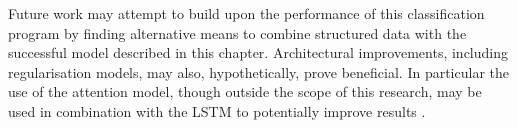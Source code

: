 Future work may attempt to build upon the performance of this classification program by finding alternative means to combine structured data with the successful model described in this chapter. Architectural improvements, including regularisation models, may also, hypothetically, prove beneficial. In particular the use of the attention model, though outside the scope of this research, may be used in combination with the LSTM to potentially improve results \cite{deepak2020deep,ma2018sentic,reddy2018predicting}.  

